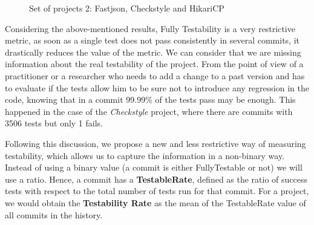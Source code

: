 \begin{figure}[!htb]
\begin{minipage}{.5\linewidth}
        \label{fig:hikari}
    \end{minipage}%
    \caption{Set of projects 2: Fastjson, Checkstyle and HikariCP}
    \label{fig:projects-2}
\end{figure}

\begin{table}[h!]
    \centering
    \caption{Metrics of set of projects 1: Fastjson, Checkstyle and HikariCP}
    \label{table:projects-2}
\end{table}

Considering the above-mentioned results, Fully Testability is a very restrictive metric, as soon as a single test does not pass consistently in several commits, it drastically reduces the value of the metric. 
We can consider that we are missing information about the real testability of the project.
From the point of view of a practitioner or a researcher who needs to add a change to a past version and has to evaluate if the tests allow him to be sure not to introduce any regression in the code, knowing that in a commit 99.99\% of the tests pass may be enough.
This happened in the case of the \textit{Checkstyle} project, where there are commits with 3506 tests but only 1 fails.

Following this discussion, we propose a new and less restrictive way of measuring testability, which allows us to capture the information in a non-binary way. 
Instead of using a binary value (a commit is either FullyTestable or not) we will use a ratio. 
Hence, a commit has a \textbf{TestableRate}, defined as the ratio of success tests with respect to the total number of tests run for that commit.
For a project, we would obtain the \textbf{Testability Rate} as the mean of the TestableRate value of all commits in the history.

